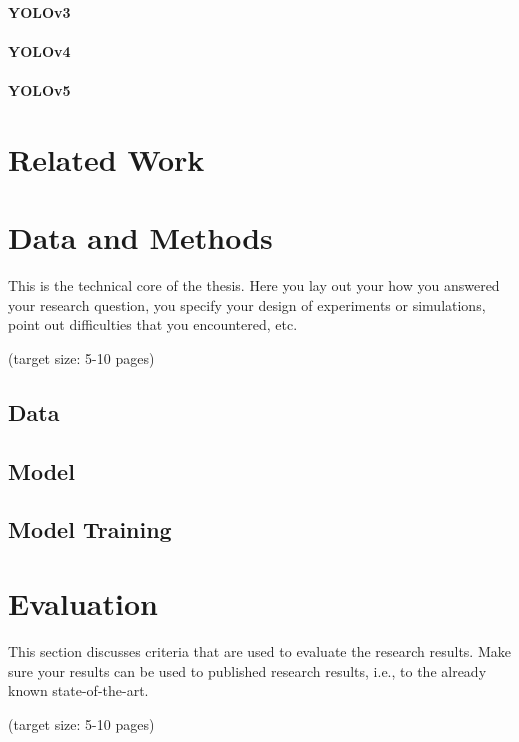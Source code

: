 \documentclass[a4paper,11pt,oneside]{article}
\begin{document}
  \paragraph{YOLOv3}
  \paragraph{YOLOv4}
  \paragraph{YOLOv5}

  \section{Related Work}


  \section{Data and Methods}

  This is the technical core of the thesis. Here you lay out your how
  you answered your research question, you specify your design of
  experiments or simulations, point out difficulties that you
  encountered, etc.

  (target size: 5-10 pages)

  \subsection{Data}
  \subsection{Model}
  \subsection{Model Training}

  \section{Evaluation}

  This section discusses criteria that are used to evaluate the
  research results. Make sure your results can be used to published
  research results, i.e., to the already known state-of-the-art.

  (target size: 5-10 pages)
\end{document}

